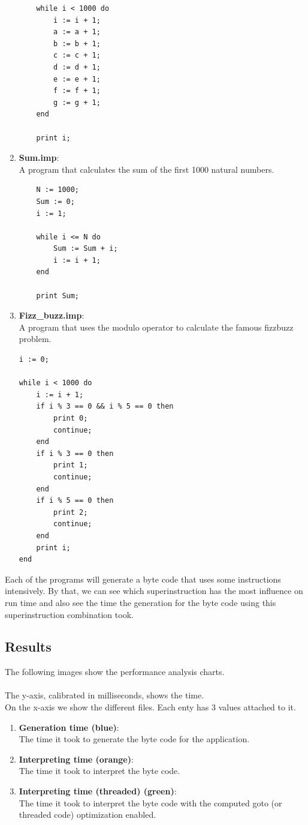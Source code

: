 \documentclass{article}
\begin{document}
\begin{enumerate}
\begin{verbatim}
    while i < 1000 do
        i := i + 1;
        a := a + 1;
        b := b + 1;
        c := c + 1;
        d := d + 1;
        e := e + 1;
        f := f + 1;
        g := g + 1;
    end

    print i;
\end{verbatim}

    \item \textbf{Sum.imp}:\\
    \label{item:inc_loop}
    A program that calculates the sum of the first 1000 natural numbers.
\begin{verbatim}
    N := 1000;
    Sum := 0;
    i := 1;

    while i <= N do
        Sum := Sum + i;
        i := i + 1;
    end

    print Sum;
\end{verbatim}
    \item \textbf{Fizz\_buzz.imp}:\\
    A program that uses the modulo operator to calculate the famous fizzbuzz problem.
\begin{verbatim}
i := 0;

while i < 1000 do
    i := i + 1;
    if i % 3 == 0 && i % 5 == 0 then
        print 0;
        continue;
    end
    if i % 3 == 0 then
        print 1;
        continue;
    end
    if i % 5 == 0 then
        print 2;
        continue;
    end
    print i;
end
\end{verbatim}
\end{enumerate}

Each of the programs will generate a byte code that uses some instructions
intensively. By that, we can see which superinstruction has the most influence on
run time and also see the time the generation for the byte code using this
superinstruction combination took.

\subsection{Results}
The following images show the performance analysis charts.
\\\\
The y-axis, calibrated in milliseconds, shows the time.
\\
On the x-axis we show the different files. Each enty has 3 values attached to it.

\begin{enumerate}
    \item \textbf{Generation time (blue)}:\\
        The time it took to generate the byte code for the application.
    \item \textbf{Interpreting time (orange)}:\\
        The time it took to interpret the byte code.
    \item \textbf{Interpreting time (threaded) (green)}:\\
        The time it took to interpret the byte code with the computed goto (or
        threaded code) optimization enabled.
\end{enumerate}
\end{document}
